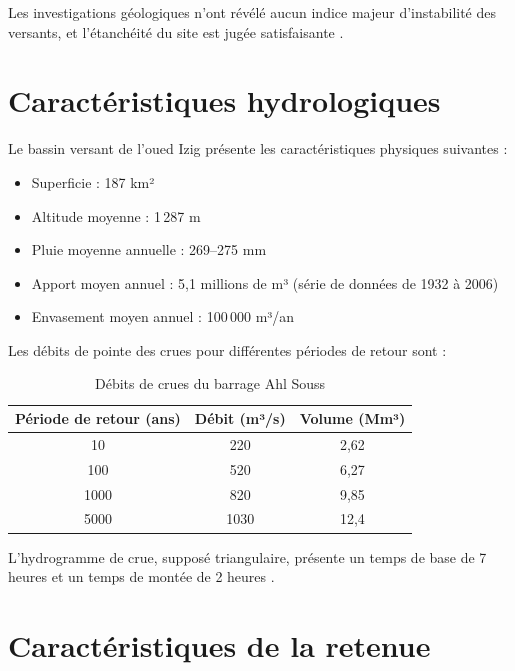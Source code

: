 Les investigations géologiques n'ont révélé aucun indice majeur d'instabilité des versants, et l'étanchéité du site est jugée satisfaisante \cite{scet1994ahl}.

\section{Caractéristiques hydrologiques}
\label{sec:hydrologie}

Le bassin versant de l'oued Izig présente les caractéristiques physiques suivantes \cite{donnees_hydrologiques, fiche_synoptique} :
\begin{itemize}
    \item Superficie : 187 km²
    \item Altitude moyenne : 1\,287 m
    \item Pluie moyenne annuelle : 269--275 mm
    \item Apport moyen annuel : 5,1 millions de m³ (série de données de 1932 à 2006) \cite{bilans_apports}
    \item Envasement moyen annuel : 100\,000 m³/an
\end{itemize}

Les débits de pointe des crues pour différentes périodes de retour sont \cite{donnees_hydrologiques, fiche_synoptique} :

\begin{table}[H]
    \centering
    \caption{Débits de crues du barrage Ahl Souss}
    \label{tab:debits_crues}
    \begin{tabular}{|c|c|c|}
        \hline
        \textbf{Période de retour (ans)} & \textbf{Débit (m³/s)} & \textbf{Volume (Mm³)} \\
        \hline
        10 & 220 & 2,62 \\
        \hline
        100 & 520 & 6,27 \\
        \hline
        1000 & 820 & 9,85 \\
        \hline
        5000 & 1030 & 12,4 \\
        \hline
    \end{tabular}
\end{table}

L'hydrogramme de crue, supposé triangulaire, présente un temps de base de 7 heures et un temps de montée de 2 heures \cite{donnees_hydrologiques}.

\section{Caractéristiques de la retenue}
\label{sec:retenue}

